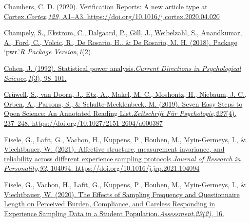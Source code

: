 \documentclass[
]{article}
\begin{document}
\href{https://www.zotero.org/google-docs/?EJLlNC}{Chambers, C. D.
(2020). Verification Reports: A new article type at
Cortex.}\href{https://www.zotero.org/google-docs/?EJLlNC}{\emph{Cortex}}\href{https://www.zotero.org/google-docs/?EJLlNC}{,}\href{https://www.zotero.org/google-docs/?EJLlNC}{\emph{129}}\href{https://www.zotero.org/google-docs/?EJLlNC}{,
A1--A3. https://doi.org/10.1016/j.cortex.2020.04.020}

\href{https://www.zotero.org/google-docs/?EJLlNC}{Champely, S., Ekstrom,
C., Dalgaard, P., Gill, J., Weibelzahl, S., Anandkumar, A., Ford, C.,
Volcic, R., De Rosario, H., \& De Rosario, M. H. (2018). Package
`pwr.'}\href{https://www.zotero.org/google-docs/?EJLlNC}{\emph{R Package
Version}}\href{https://www.zotero.org/google-docs/?EJLlNC}{,}\href{https://www.zotero.org/google-docs/?EJLlNC}{\emph{1}}\href{https://www.zotero.org/google-docs/?EJLlNC}{(2).}

\href{https://www.zotero.org/google-docs/?EJLlNC}{Cohen, J. (1992).
Statistical power
analysis.}\href{https://www.zotero.org/google-docs/?EJLlNC}{\emph{Current
Directions in Psychological
Science}}\href{https://www.zotero.org/google-docs/?EJLlNC}{,}\href{https://www.zotero.org/google-docs/?EJLlNC}{\emph{1}}\href{https://www.zotero.org/google-docs/?EJLlNC}{(3),
98--101.}

\href{https://www.zotero.org/google-docs/?EJLlNC}{Crüwell, S., van
Doorn, J., Etz, A., Makel, M. C., Moshontz, H., Niebaum, J. C., Orben,
A., Parsons, S., \& Schulte-Mecklenbeck, M. (2019). Seven Easy Steps to
Open Science: An Annotated Reading
List.}\href{https://www.zotero.org/google-docs/?EJLlNC}{\emph{Zeitschrift
Für
Psychologie}}\href{https://www.zotero.org/google-docs/?EJLlNC}{,}\href{https://www.zotero.org/google-docs/?EJLlNC}{\emph{227}}\href{https://www.zotero.org/google-docs/?EJLlNC}{(4),
237--248. https://doi.org/10.1027/2151-2604/a000387}

\href{https://www.zotero.org/google-docs/?EJLlNC}{Eisele, G., Lafit, G.,
Vachon, H., Kuppens, P., Houben, M., Myin-Germeys, I., \& Viechtbauer,
W. (2021). Affective structure, measurement invariance, and reliability
across different experience sampling
protocols.}\href{https://www.zotero.org/google-docs/?EJLlNC}{\emph{Journal
of Research in
Personality}}\href{https://www.zotero.org/google-docs/?EJLlNC}{,}\href{https://www.zotero.org/google-docs/?EJLlNC}{\emph{92}}\href{https://www.zotero.org/google-docs/?EJLlNC}{,
104094. https://doi.org/10.1016/j.jrp.2021.104094}

\href{https://www.zotero.org/google-docs/?EJLlNC}{Eisele, G., Vachon,
H., Lafit, G., Kuppens, P., Houben, M., Myin-Germeys, I., \&
Viechtbauer, W. (2020). The Effects of Sampling Frequency and
Questionnaire Length on Perceived Burden, Compliance, and Careless
Responding in Experience Sampling Data in a Student
Population.}\href{https://www.zotero.org/google-docs/?EJLlNC}{\emph{Assessment}}\href{https://www.zotero.org/google-docs/?EJLlNC}{,}\href{https://www.zotero.org/google-docs/?EJLlNC}{\emph{29(2)}}\href{https://www.zotero.org/google-docs/?EJLlNC}{,
16.}
\end{document}
